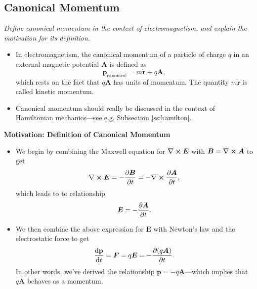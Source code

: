 \documentclass[11pt, a4paper]{article}
\renewcommand{\vec}[1]{\bm{#1}} %
\newcommand{\mat}[1]{\mathbf{#1}} %
\newcommand{\E}{\vec{E}} %
\newcommand{\B}{\vec{B}} %
\newcommand{\A}{\vec{A}} %
\renewcommand{\curl}{\nabla \cross}
\begin{document}
\subsection{Canonical Momentum}
\textit{Define canonical momentum in the context of electromagnetism, and explain the motivation for its definition.}

\begin{itemize}
    \item In electromagnetism, the canonical momentum of a particle of charge $ q $ in an external magnetic potential $ \A $ is defined as
    \begin{equation*}
        \vec{p}_{\text{canonical}} = m \dot{\vec{r}} + q\A,
    \end{equation*}
    which rests on the fact that $ q\A $ has units of momentum. The quantity $ m \dot{\vec{r}} $ is called kinetic momentum.

    \item Canonical momentum should really be discussed in the context of Hamiltonian mechanics---see e.g. \hyperref[ss:hamilton]{\underline{Subsection \ref{ss:hamilton}}}.

\end{itemize}

\textbf{Motivation: Definition of Canonical Momentum}
\begin{itemize}
	\item We begin by combining the Maxwell equation for $ \curl \E $ with $ \B = \curl \A $ to get
	\begin{equation*}
		\curl \E = - \pdv{\B}{t} = - \curl \pdv{\A}{t},
	\end{equation*}
	which leads to to relationship
	\begin{equation*}
		\E = - \pdv{\A}{t}.
	\end{equation*}
	\item We then combine the above expression for $ \E $ with Newton's law and the electrostatic force to get
	\begin{equation*}
		\dv{\mat{p}}{t} = \vec{F} = q \E = - \pdv{(q \A)}{t}.
	\end{equation*} 
    In other words, we've derived the relationship $ \vec{p} = - q \A $---which implies that $ q\A $ behaves as a momentum.
	
\end{itemize}
\end{document}
